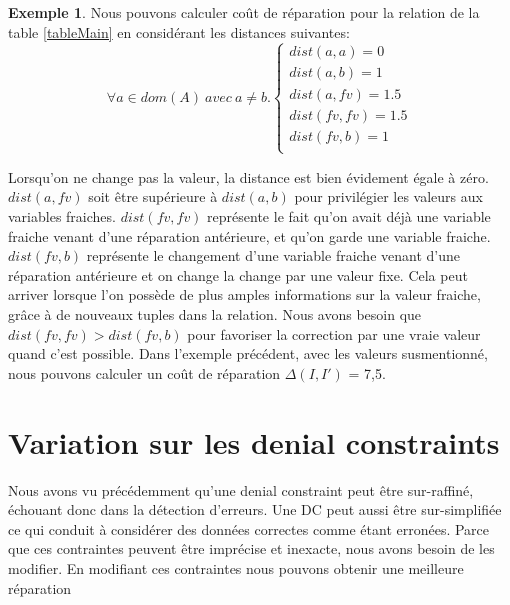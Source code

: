 \documentclass[letterpaper, 12pt]{report}
\theoremstyle{definition}
\newtheorem{myexample}{Exemple}
\begin{document}
\begin{myexample}
Nous pouvons calculer coût de réparation pour la relation de la table \ref{tableMain} en considérant les distances suivantes:\\

$$
\forall a \in dom(A) \ avec \ a \neq b.
\left\{
	\begin{array}{ll}
	   dist(a,a)=0\\
	   dist(a,b)=1\\
	   dist(a,fv)=1.5\\
	   dist(fv,fv)=1.5\\
	   dist(fv,b)=1\\
	\end{array}
\right.
$$

Lorsqu'on ne change pas la valeur, la distance est bien évidement égale à zéro. $dist(a,fv)$ soit être supérieure à $dist(a,b)$ pour privilégier les valeurs aux variables fraiches. $dist(fv,fv)$ représente le fait qu'on avait déjà une variable fraiche venant d'une réparation antérieure, et qu'on garde une variable fraiche. $dist(fv,b)$ représente le changement d'une variable fraiche venant d'une réparation antérieure et on change la change par une valeur fixe. Cela peut arriver lorsque l'on possède de plus amples informations sur la valeur fraiche, grâce à de nouveaux tuples dans la relation. Nous avons besoin que $dist(fv,fv) > dist(fv,b)$ pour favoriser la correction par une vraie valeur quand c'est possible. Dans l'exemple précédent, avec les valeurs susmentionné, nous pouvons calculer un coût de réparation $\Delta(I,I')$ = 7,5.
\end {myexample}

\section{Variation sur les denial constraints}

Nous avons vu précédemment qu'une denial constraint peut être sur-raffiné, échouant donc dans la détection d'erreurs. Une DC peut aussi être sur-simplifiée ce qui conduit à considérer des données correctes comme étant erronées. Parce que ces contraintes peuvent être imprécise et inexacte, nous avons besoin de les modifier. En modifiant ces contraintes nous pouvons obtenir une meilleure réparation\\
\end{document}
